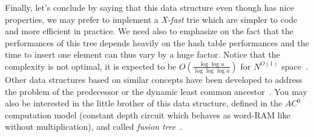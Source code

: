 Finally, let's conclude by saying that this data structure even though has nice properties, we may prefer to implement a \textit{X-fast} trie which are simpler to code and more efficient in practice. We need also to emphasize on the fact that the performances of this tree depends heavily on the hash table performances and the time to insert one element can thus vary by a huge factor. Notice that the complexity is not optimal, it is expected to be $O(\frac{\log \log u}{\log \log \log u})$ for $N^{O(1)}$ space~\cite{patracscu2007randomization}. Other data structures based on similar concepts have been developed to address the problem of the predecessor or the dynamic least common ancestor~\cite{bose2013fast,belazzougui2009monotone}. You may also be interested in the little brother of this data structure, defined in the $AC^{0}$ computation model (constant depth circuit which behaves as word-RAM like without multiplication), and called \textit{fusion tree}~\cite{fredman1990blasting}.
